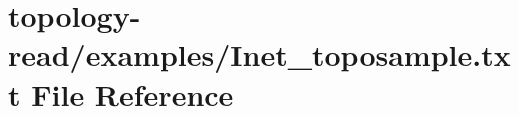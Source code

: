 \hypertarget{Inet__toposample_8txt}{}\section{topology-\/read/examples/\+Inet\+\_\+toposample.txt File Reference}
\label{Inet__toposample_8txt}

